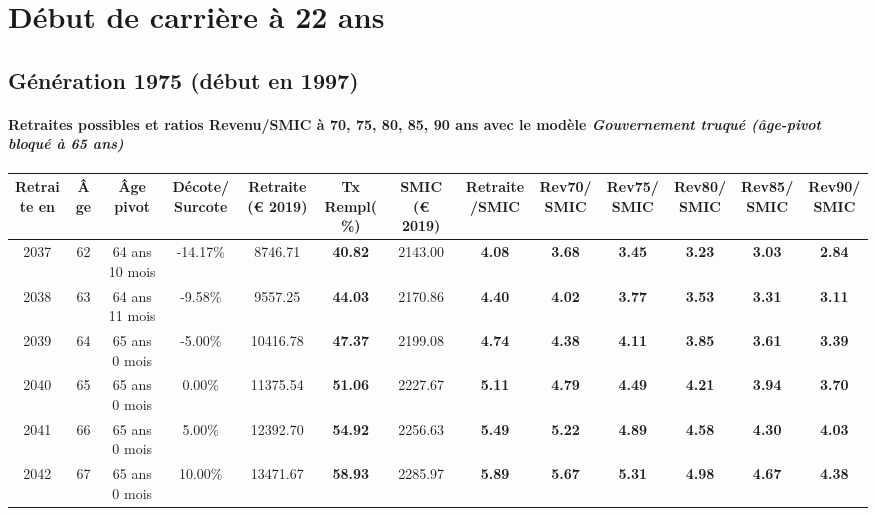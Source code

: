  \addto{\captionsenglish}{ \renewcommand{\mtctitle}{}} \setcounter{minitocdepth}{2} 
 \minitoc \newpage 

\section{Début de carrière à 22 ans} 

\subsection{Génération 1975 (début en 1997)} 

\paragraph{Retraites possibles et ratios Revenu/SMIC à 70, 75, 80, 85, 90 ans avec le modèle \emph{Gouvernement truqué (âge-pivot bloqué à 65 ans)}}  
 
{ \scriptsize \begin{center} 
\begin{tabular}[htb]{|c|c||c|c||c|c||c||c|c|c|c|c|c|} 
\hline 
 Retraite en &  Âge &  Âge pivot &  Décote/Surcote &  Retraite (\euro{} 2019) &  Tx Rempl(\%) &  SMIC (\euro{} 2019) &  Retraite/SMIC &  Rev70/SMIC &  Rev75/SMIC &  Rev80/SMIC &  Rev85/SMIC &  Rev90/SMIC \\ 
\hline \hline 
 2037 &  62 &  64 ans 10 mois &  -14.17\% &  8746.71 &  {\bf 40.82} &  2143.00 &  {\bf 4.08} &  {\bf 3.68} &  {\bf 3.45} &  {\bf 3.23} &  {\bf 3.03} &  {\bf 2.84} \\ 
\hline 
 2038 &  63 &  64 ans 11 mois &  -9.58\% &  9557.25 &  {\bf 44.03} &  2170.86 &  {\bf 4.40} &  {\bf 4.02} &  {\bf 3.77} &  {\bf 3.53} &  {\bf 3.31} &  {\bf 3.11} \\ 
\hline 
 2039 &  64 &  65 ans 0 mois &  -5.00\% &  10416.78 &  {\bf 47.37} &  2199.08 &  {\bf 4.74} &  {\bf 4.38} &  {\bf 4.11} &  {\bf 3.85} &  {\bf 3.61} &  {\bf 3.39} \\ 
\hline 
 2040 &  65 &  65 ans 0 mois &  0.00\% &  11375.54 &  {\bf 51.06} &  2227.67 &  {\bf 5.11} &  {\bf 4.79} &  {\bf 4.49} &  {\bf 4.21} &  {\bf 3.94} &  {\bf 3.70} \\ 
\hline 
 2041 &  66 &  65 ans 0 mois &  5.00\% &  12392.70 &  {\bf 54.92} &  2256.63 &  {\bf 5.49} &  {\bf 5.22} &  {\bf 4.89} &  {\bf 4.58} &  {\bf 4.30} &  {\bf 4.03} \\ 
\hline 
 2042 &  67 &  65 ans 0 mois &  10.00\% &  13471.67 &  {\bf 58.93} &  2285.97 &  {\bf 5.89} &  {\bf 5.67} &  {\bf 5.31} &  {\bf 4.98} &  {\bf 4.67} &  {\bf 4.38} \\ 
\hline 
\hline 
\end{tabular} 
\end{center} } 
